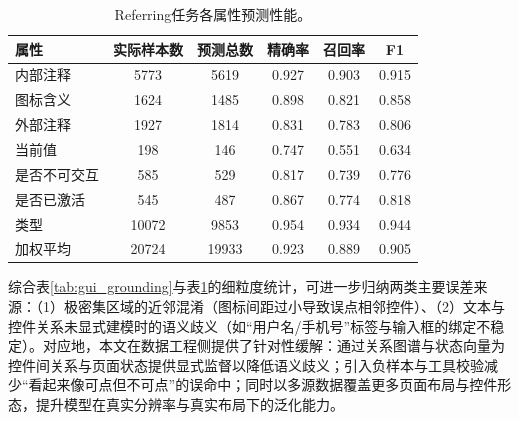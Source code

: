 \begin{table}[htbp]
\centering
\caption{Referring任务各属性预测性能。}
\label{tab:gui_referring}
\small
\renewcommand{\arraystretch}{1.2}
\begin{tabular}{lccccc}
\toprule
属性 & 实际样本数 & 预测总数 & 精确率 & 召回率 & F1 \\
\midrule
内部注释 & 5773 & 5619 & 0.927 & 0.903 & 0.915 \\
图标含义 & 1624 & 1485 & 0.898 & 0.821 & 0.858 \\
外部注释 & 1927 & 1814 & 0.831 & 0.783 & 0.806 \\
当前值 & 198 & 146 & 0.747 & 0.551 & 0.634 \\
是否不可交互 & 585 & 529 & 0.817 & 0.739 & 0.776 \\
是否已激活 & 545 & 487 & 0.867 & 0.774 & 0.818 \\
类型 & 10072 & 9853 & 0.954 & 0.934 & 0.944 \\
加权平均 & 20724 & 19933 & 0.923 & 0.889 & 0.905 \\
\bottomrule
\end{tabular}

\end{table}

综合表\ref{tab:gui_grounding}与表\ref{tab:gui_referring}的细粒度统计，可进一步归纳两类主要误差来源：（1）极密集区域的近邻混淆（图标间距过小导致误点相邻控件）、（2）文本与控件关系未显式建模时的语义歧义（如“用户名/手机号”标签与输入框的绑定不稳定）。对应地，本文在数据工程侧提供了针对性缓解：通过关系图谱与状态向量为控件间关系与页面状态提供显式监督以降低语义歧义；引入负样本与工具校验减少“看起来像可点但不可点”的误命中；同时以多源数据覆盖更多页面布局与控件形态，提升模型在真实分辨率与真实布局下的泛化能力。

